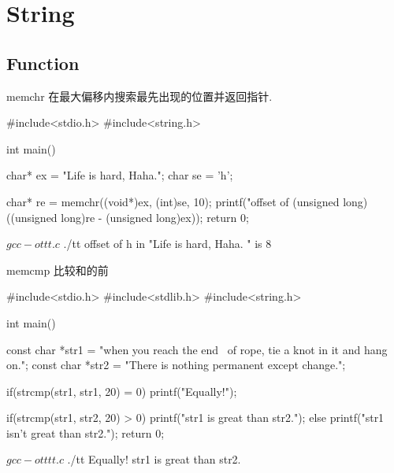 \chapter{String}

\section{Function}

\begin{cfunc}{memchr}
在最大偏移内搜索最先出现的位置并返回指针.
\begin{usage}
\begin{sccode}
#include<stdio.h>
#include<string.h>

int main()
{
    char* ex = "Life is hard, Haha.\n";
    char se = 'h';

    char* re = memchr((void*)ex, (int)se, 10);
    printf("offset of %
        (unsigned long)((unsigned long)re -
                (unsigned long)ex));
    return 0;
}
\end{sccode}
\comout
\begin{sbcode}
$ gcc -o tt t.c
$ ./tt
offset of h in "Life is hard, Haha.
" is 8
\end{sbcode}
\end{usage}
\end{cfunc}

\begin{cfunc}{memcmp}
比较和的前\bytes
\begin{usage}
\begin{sccode}
#include<stdio.h>
#include<stdlib.h>
#include<string.h>

int main()
{
    const char *str1 = "when you reach the end \
of rope, tie a knot in it and hang on.";
    const char *str2 = "There is nothing permanent except change.";

    if(strcmp(str1, str1, 20) = 0){
        printf("Equally!\n");
    }

    if(strcmp(str1, str2, 20) > 0){
        printf("str1 is great than str2.\n");
    } else {
        printf("str1 isn't great than str2.\n");
    }
    return 0;
}
\end{sccode}
\comout
\begin{sbcode}
$ gcc -o tt tt.c
$ ./tt
Equally!
str1 is great than str2.
\end{sbcode}
\end{usage}
\end{cfunc}

